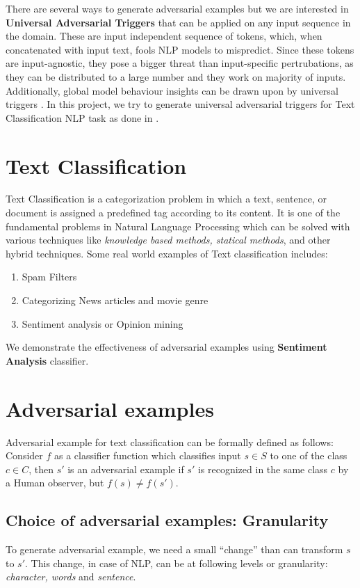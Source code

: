 \documentclass[12pt]{report}
\begin{document}
\begin{spacing}{1.5}
There are several ways to generate adversarial examples but we are interested in \textbf{Universal Adversarial Triggers} that can be applied on any input sequence in the domain.
These are input independent sequence of tokens, which, when concatenated with input text, fools NLP models to mispredict. Since these tokens are input-agnostic, they pose a bigger threat than input-specific pertrubations, as they can be distributed to a large number and they work on majority of inputs. Additionally, global model behaviour insights can be drawn upon by universal triggers \cite{wallace2019}. In this project, we try to generate universal adversarial triggers for Text Classification NLP task as done in \cite{wallace2019, behjati2019}.

\section{Text Classification}
Text Classification is a categorization problem in which a text, sentence, or document is assigned a predefined tag according to its content. It is one of the fundamental problems in Natural Language Processing which can be solved with various techniques like \textit{knowledge based methods, statical methods}, and other hybrid techniques.
Some real world examples of Text classification includes:
\begin{enumerate}
\item Spam Filters
\item Categorizing News articles and movie genre
\item Sentiment analysis or Opinion mining
\end{enumerate}
We demonstrate the effectiveness of adversarial examples using \textbf{Sentiment Analysis} classifier.

\section{Adversarial examples}

Adversarial example for text classification can be formally defined as follows:
Consider $f$ as a classifier function which classifies input $s \in S$ to one of the class $c \in C$, then $s'$ is an adversarial example if $s'$ is recognized in the same class $c$ by a Human observer, but $f(s) \neq f(s')$.

\subsection{Choice of adversarial examples: Granularity}
To generate adversarial example, we need a small ``change'' than can transform $s$ to $s'$. This change, in case of NLP, can be at following levels or granularity: \textit{character, words} and \textit{ sentence}.

\end{spacing}
\end{document}
